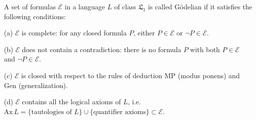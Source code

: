 A set of formulas $\mathcal{E}$ in a language $L$ of class $\mathfrak{L}_1$ is called Gödelian if it satisfies the following conditions:

(a) $\mathcal{E}$ is complete: for any closed formula $P$, either $P \in \mathcal{E}$ or $\neg P \in \mathcal{E}$.

(b) $\mathcal{E}$ does not contain a contradiction: there is no formula $P$ with both $P \in \mathcal{E}$ and $\neg P \in \mathcal{E}$.

(c) $\mathcal{E}$ is closed with respect to the rules of deduction MP (modus ponens) and Gen (generalization).

(d) $\mathcal{E}$ contains all the logical axioms of $L$, i.e. $\mathrm{Ax}\,L = \{\text{tautologies of } L\} \cup \{\text{quantifier axioms}\} \subset \mathcal{E}$.
